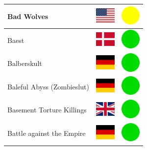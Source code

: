 \documentclass[12pt, a4paper, twoside]{report}
\begin{document}
\begin{center}
\begin{longtable}{|p{5cm}|p{2cm}|p{2cm}|}
Bad Wolves & \includegraphics[width=1cm]{4x3/us} & \includegraphics[width=1cm]{likes/m} \\ \hline
Baest & \includegraphics[width=1cm]{4x3/dk} & \includegraphics[width=1cm]{likes/y} \\ \hline
Balberskult & \includegraphics[width=1cm]{4x3/de} & \includegraphics[width=1cm]{likes/y} \\ \hline
Baleful Abyss (Zombieslut) & \includegraphics[width=1cm]{4x3/de} & \includegraphics[width=1cm]{likes/y} \\ \hline
Basement Torture Killings & \includegraphics[width=1cm]{4x3/gb} & \includegraphics[width=1cm]{likes/y} \\ \hline
Battle against the Empire & \includegraphics[width=1cm]{4x3/de} & \includegraphics[width=1cm]{likes/y} \\ \hline

\end{longtable}
\end{center}
\end{document}
